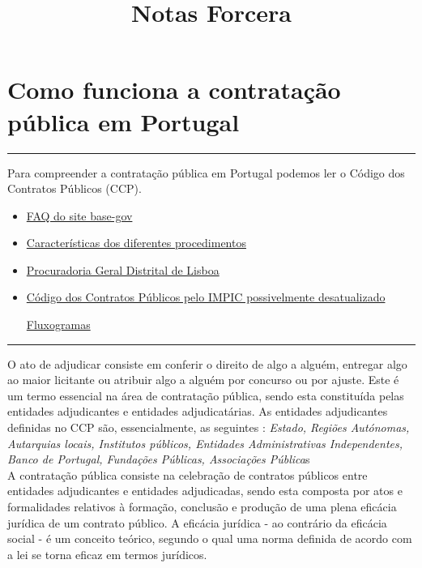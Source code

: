 \documentclass{book}
\title{Notas Forcera}
\begin{document}
	
	\section*{Como funciona a contratação pública em Portugal}
	\hrule
	\vspace{1cm}
	
	Para compreender a contratação pública em Portugal podemos ler o Código dos Contratos Públicos (CCP). 
	
	\begin{itemize}
		
		\item \href{https://www.base.gov.pt/Base4/pt/perguntas-frequentes/}{FAQ do site base-gov}
		
		\item \href{https://www.base.gov.pt/Base4/pt/documentacao/caracteristicas-dos-procedimentos/}{Características dos diferentes procedimentos}
		
		\item \href{https://www.pgdlisboa.pt/leis/lei_mostra_articulado.php?nid=2063&tabela=leis&so_miolo=}{Procuradoria Geral Distrital de Lisboa}
		
		\item \href{https://www.base.gov.pt/base4/media/ferbgqli/ccp-consolidado-impic-ap%C3%B3s-lei-30-2021.pdf}{Código dos Contratos Públicos pelo IMPIC possivelmente desatualizado}
		
		\href{https://www.base.gov.pt/Base4/pt/documentacao/caracteristicas-dos-procedimentos/}{Fluxogramas}
		
	\end{itemize}
	
	\hrule
	\vspace{1cm}
	
	O ato de adjudicar consiste em conferir o direito de algo a alguém, entregar algo ao maior licitante ou atribuir algo a alguém por concurso ou por ajuste. Este é um termo essencial na área de contratação pública, sendo esta constituída pelas entidades adjudicantes e entidades adjudicatárias. As entidades adjudicantes definidas no CCP são, essencialmente, as seguintes : \textit{Estado, Regiões Autónomas, Autarquias locais, Institutos públicos, Entidades Administrativas Independentes, Banco de Portugal, Fundações Públicas, Associações Pública}s\\
	
	A contratação pública consiste na celebração de contratos públicos entre entidades adjudicantes e entidades adjudicadas, sendo esta composta por atos e formalidades relativos à formação, conclusão e produção de uma plena eficácia jurídica de um contrato público. A eficácia jurídica - ao contrário da eficácia social - é um conceito teórico, segundo o qual uma norma definida de acordo com a lei se torna eficaz em termos jurídicos. \\
	
\end{document}
